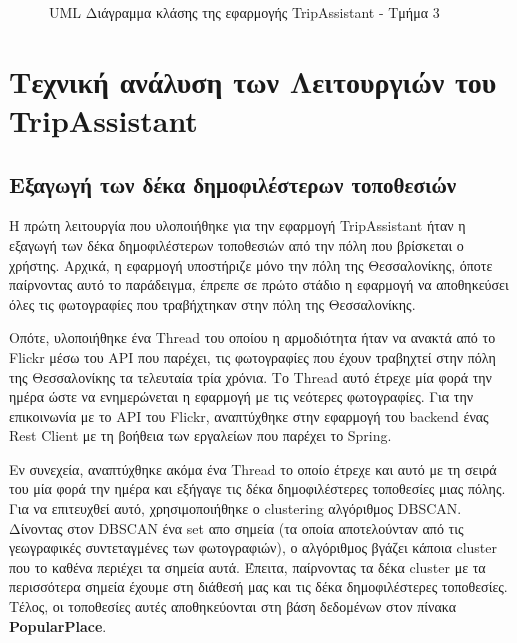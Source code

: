 \documentclass[oneside, 12pt]{book}
\begin{document}
\begin{figure}[H]
    \caption{UML Διάγραμμα κλάσης της εφαρμογής TripAssistant - Τμήμα 3}
    \label{fig:uml_diagram_tripassistant_part3}
\end{figure}

\section{Τεχνική ανάλυση των Λειτουργιών του TripAssistant}
\subsection{Εξαγωγή των δέκα δημοφιλέστερων τοποθεσιών} \label{sec:tech_top_10_popular}
Η πρώτη λειτουργία που υλοποιήθηκε για την εφαρμογή TripAssistant 
ήταν η εξαγωγή των δέκα δημοφιλέστερων τοποθεσιών από την πόλη που 
βρίσκεται ο χρήστης. Αρχικά, η εφαρμογή υποστήριζε μόνο την πόλη της 
Θεσσαλονίκης, όποτε παίρνοντας αυτό το παράδειγμα, έπρεπε σε πρώτο 
στάδιο η εφαρμογή να αποθηκεύσει όλες τις φωτογραφίες που τραβήχτηκαν 
στην πόλη της Θεσσαλονίκης. 

Οπότε, υλοποιήθηκε ένα Thread του οποίου 
η αρμοδιότητα ήταν να ανακτά από το Flickr μέσω του API που παρέχει, 
τις φωτογραφίες που έχουν τραβηχτεί στην πόλη της Θεσσαλονίκης τα 
τελευταία τρία χρόνια. Το Thread αυτό έτρεχε μία φορά την ημέρα ώστε 
να ενημερώνεται η εφαρμογή με τις νεότερες φωτογραφίες.
Για την επικοινωνία με το API του Flickr, αναπτύχθηκε στην εφαρμογή του backend ένας Rest Client με τη βοήθεια των εργαλείων που 
παρέχει το Spring.  

Εν συνεχεία, αναπτύχθηκε ακόμα ένα Thread το οποίο έτρεχε και αυτό με 
τη σειρά του μία φορά την ημέρα και εξήγαγε τις δέκα δημοφιλέστερες 
τοποθεσίες μιας πόλης. Για να επιτευχθεί αυτό, χρησιμοποιήθηκε ο 
clustering αλγόριθμος DBSCAN. Δίνοντας στον DBSCAN ένα set απο σημεία 
(τα οποία αποτελούνταν από τις γεωγραφικές συντεταγμένες των 
φωτογραφιών), ο αλγόριθμος βγάζει κάποια cluster που το καθένα 
περιέχει τα σημεία αυτά. Έπειτα, παίρνοντας τα δέκα cluster με τα 
περισσότερα σημεία έχουμε στη διάθεσή μας και τις δέκα δημοφιλέστερες 
τοποθεσίες. Τέλος, οι τοποθεσίες αυτές αποθηκεύονται στη βάση 
δεδομένων στον πίνακα \textbf{PopularPlace}.
\end{document}
